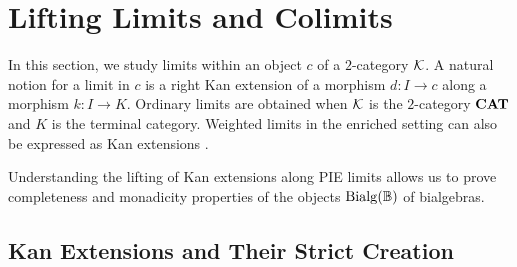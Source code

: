 
\section{Lifting Limits and Colimits}\label{sec:lifting_limits}
In this section, we study limits within an object $c$ of a $2$-category $\mathcal{K}$. A natural notion for a limit in $c$ is a right Kan extension of a morphism $d\colon I\to c$ along a morphism $k\colon I\to K$. Ordinary limits are obtained when $\mathcal{K}$ is the $2$-category $\mathbf{CAT}$ and $K$ is the terminal category. Weighted limits in the enriched setting can also be expressed as Kan extensions \cite{Kelly:Enriched}.

Understanding the lifting of Kan extensions along PIE limits allows us to prove completeness and monadicity properties of the objects $\mathrm{Bialg}(\mathbb{B})$ of bialgebras.

\subsection{Kan Extensions and Their Strict Creation}

